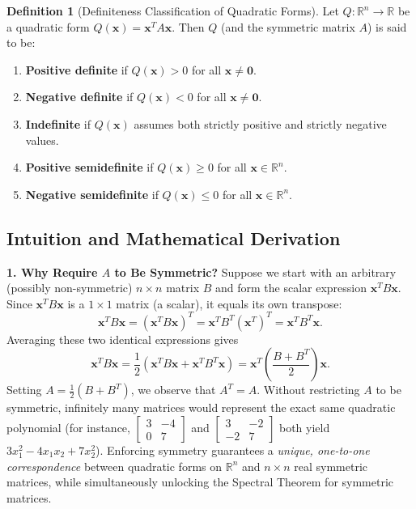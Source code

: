 \documentclass[11pt, letterpaper]{article}
\theoremstyle{definition}
\newtheorem{definition}{Definition}[section]
\theoremstyle{remark}
\newcommand{\R}{\mathbb{R}}
\begin{document}
\begin{definition}[Definiteness Classification of Quadratic Forms]
Let $Q : \R^n \to \R$ be a quadratic form $Q(\mathbf{x}) = \mathbf{x}^T A \mathbf{x}$. Then $Q$ (and the symmetric matrix $A$) is said to be:
\begin{enumerate}[label=\alph*.]
    \item \textbf{Positive definite} if $Q(\mathbf{x}) > 0$ for all $\mathbf{x} \neq \mathbf{0}$.
    \item \textbf{Negative definite} if $Q(\mathbf{x}) < 0$ for all $\mathbf{x} \neq \mathbf{0}$.
    \item \textbf{Indefinite} if $Q(\mathbf{x})$ assumes both strictly positive and strictly negative values.
    \item \textbf{Positive semidefinite} if $Q(\mathbf{x}) \ge 0$ for all $\mathbf{x} \in \R^n$.
    \item \textbf{Negative semidefinite} if $Q(\mathbf{x}) \le 0$ for all $\mathbf{x} \in \R^n$.
\end{enumerate}
\end{definition}

\subsection{Intuition and Mathematical Derivation}

\textbf{1. Why Require $A$ to Be Symmetric?}
Suppose we start with an arbitrary (possibly non-symmetric) $n \times n$ matrix $B$ and form the scalar expression $\mathbf{x}^T B \mathbf{x}$. Since $\mathbf{x}^T B \mathbf{x}$ is a $1 \times 1$ matrix (a scalar), it equals its own transpose:
\[
\mathbf{x}^T B \mathbf{x} = (\mathbf{x}^T B \mathbf{x})^T = \mathbf{x}^T B^T (\mathbf{x}^T)^T = \mathbf{x}^T B^T \mathbf{x}.
\]
Averaging these two identical expressions gives
\[
\mathbf{x}^T B \mathbf{x} = \frac{1}{2}\left(\mathbf{x}^T B \mathbf{x} + \mathbf{x}^T B^T \mathbf{x}\right) = \mathbf{x}^T \left(\frac{B + B^T}{2}\right) \mathbf{x}.
\]
Setting $A = \frac{1}{2}(B + B^T)$, we observe that $A^T = A$. Without restricting $A$ to be symmetric, infinitely many matrices would represent the exact same quadratic polynomial (for instance, $\begin{bmatrix} 3 & -4 \\ 0 & 7 \end{bmatrix}$ and $\begin{bmatrix} 3 & -2 \\ -2 & 7 \end{bmatrix}$ both yield $3x_1^2 - 4x_1x_2 + 7x_2^2$). Enforcing symmetry guarantees a \emph{unique, one-to-one correspondence} between quadratic forms on $\R^n$ and $n \times n$ real symmetric matrices, while simultaneously unlocking the Spectral Theorem for symmetric matrices.
\end{document}
